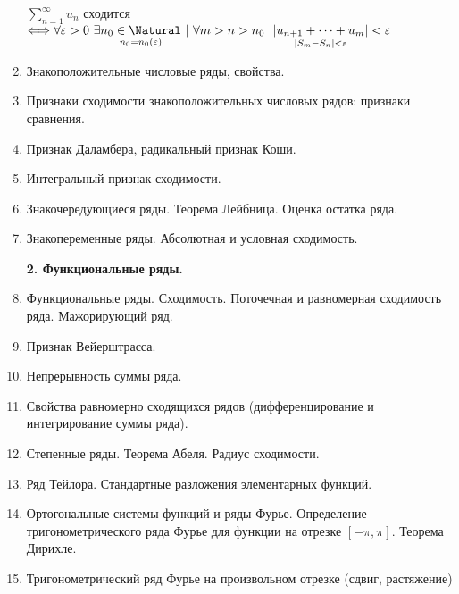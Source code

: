 \begin{enumerate}
    \begin{MyTheorem}
        $\sum_{n = 1}^\infty u_n$ сходится $\Longleftrightarrow \forall \varepsilon > 0 \ \exists \underset{n_0 = n_0 (\varepsilon)}{n_0 \in \Natural} \ | \ \forall m > n > n_0 \ \ \underset{|S_m - S_n| < \varepsilon}{|u_{n + 1} + \dots + u_m|} < \varepsilon$
    \end{MyTheorem}


    \item Знакоположительные числовые ряды, свойства.
    \item Признаки сходимости знакоположительных числовых рядов: признаки сравнения.
    \item Признак Даламбера, радикальный признак Коши.
    \item Интегральный признак сходимости.
    \item Знакочередующиеся ряды. Теорема Лейбница. Оценка остатка ряда.
    \item Знакопеременные ряды. Абсолютная и условная сходимость.

\begin{center}
    \textbf{2. Функциональные ряды.}
\end{center}

    \item Функциональные ряды. Сходимость. Поточечная и равномерная сходимость ряда.
    Мажорирующий ряд.
    \item Признак Вейерштрасса.
    \item Непрерывность суммы ряда.
    \item Свойства равномерно сходящихся рядов (дифференцирование и интегрирование суммы
    ряда).
    \item Степенные ряды. Теорема Абеля. Радиус сходимости.
    \item Ряд Тейлора. Стандартные разложения элементарных функций.
    \item Ортогональные системы функций и ряды Фурье. Определение тригонометрического ряда
    Фурье для функции на отрезке $[-\pi, \pi]$. Теорема Дирихле.
    \item Тригонометрический ряд Фурье на произвольном отрезке (сдвиг, растяжение)
\end{enumerate}